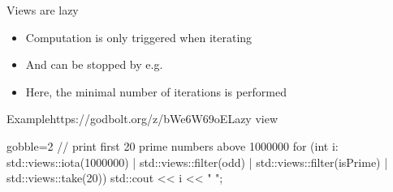 \begin{frame}[fragile]
  \begin{block}{Views are lazy}
    \begin{itemize}
    \item Computation is only triggered when iterating
    \item And can be stopped by e.g. 
    \item Here, the minimal number of iterations is performed
    \end{itemize}
  \end{block}
  \begin{exampleblockGB}{Example}{https://godbolt.org/z/bWe6W69oE}{Lazy view}
    \begin{cppcode*}{gobble=2}
      // print first 20 prime numbers above 1000000
      for (int i: std::views::iota(1000000)
                  | std::views::filter(odd)
                  | std::views::filter(isPrime)
                  | std::views::take(20)) {
        std::cout << i << " ";
      }
    \end{cppcode*}
  \end{exampleblockGB}
\end{frame}
